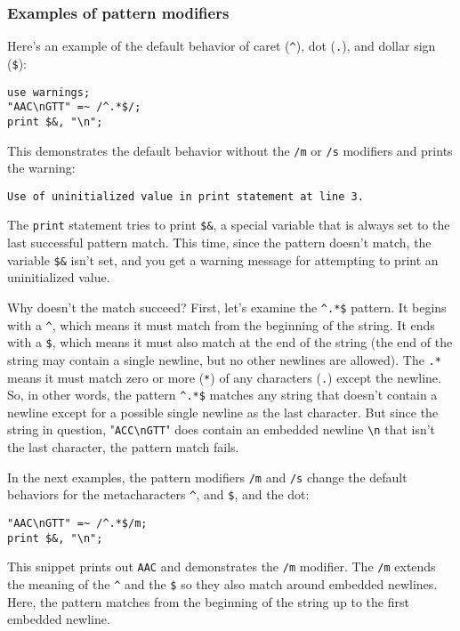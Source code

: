 \subsubsection{Examples of pattern modifiers}
Here's an example of the default behavior of caret (\verb|^|), dot (\verb|.|), and dollar sign (\verb|$|): 

\begin{lstlisting}
use warnings;
"AAC\nGTT" =~ /^.*$/;
print $&, "\n";
\end{lstlisting}

This demonstrates the default behavior without the \verb|/m| or \verb|/s| modifiers and prints the warning:

\begin{lstlisting}
Use of uninitialized value in print statement at line 3.
\end{lstlisting}

The \verb|print| statement tries to print \verb|$&|, a special variable that is always set to the last successful pattern match. This time, since the pattern doesn't match, the variable \verb|$&| isn't set, and you get a warning message for attempting to print an uninitialized value. 

Why doesn't the match succeed? First, let's examine the \verb|^.*$| pattern. It begins with a \verb|^|, which means it must match from the beginning of the string. It ends with a \verb|$|, which means it must also match at the end of the string (the end of the string may contain a single newline, but no other newlines are allowed). The \verb|.*| means it must match zero or more (\verb|*|) of any characters (\verb|.|) except the newline. So, in other words, the pattern \verb|^.*$| matches any string that doesn't contain a newline except for a possible single newline as the last character. But since the string in question, "\verb|ACC\nGTT|" does contain an embedded newline \verb|\n| that isn't the last character, the pattern match fails.

In the next examples, the pattern modifiers \verb|/m| and \verb|/s| change the default
behaviors for the metacharacters \verb|^|, and \verb|$|, and the dot: 

\begin{lstlisting}
"AAC\nGTT" =~ /^.*$/m;
print $&, "\n";
\end{lstlisting}

This snippet prints out \verb|AAC| and demonstrates the \verb|/m| modifier. The \verb|/m| extends the meaning of the \verb|^| and the \verb|$| so they also match around embedded newlines. Here, the pattern matches from the beginning of the string up to the first embedded newline.

